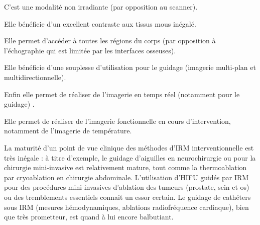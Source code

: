 
\begin{description}
    \item C’est une modalité non irradiante (par opposition au scanner). 
    \item Elle bénéficie d’un excellent contraste aux tissus mous inégalé.
    \item Elle permet d’accéder à toutes les régions du corps (par opposition à l’échographie qui est
limitée par les interfaces osseuses).
    \item Elle bénéficie d’une souplesse d’utilisation pour le guidage (imagerie multi-plan et multidirectionnelle).
    \item Enfin elle permet de réaliser de l’imagerie en temps réel (notamment pour le guidage) .
    \item Elle permet de réaliser de l’imagerie fonctionnelle en cours d’intervention, notamment de
l’imagerie de température.
\end{description}

La maturité d’un point de vue clinique des méthodes d’IRM interventionnelle est très inégale : à titre d’exemple, le guidage d’aiguilles en neurochirurgie ou pour la chirurgie mini-invasive est relativement mature, tout comme la thermoablation par cryoablation en chirurgie abdominale. L’utilisation d’HIFU guidés par IRM pour des procédures mini-invasives d’ablation des tumeurs (prostate, sein et os) ou des tremblements essentiels connait un essor certain. Le guidage de cathéters sous IRM (mesures hémodynamiques, ablations radiofréquence cardiaque), bien que très prometteur, est quand à lui encore balbutiant.\\
